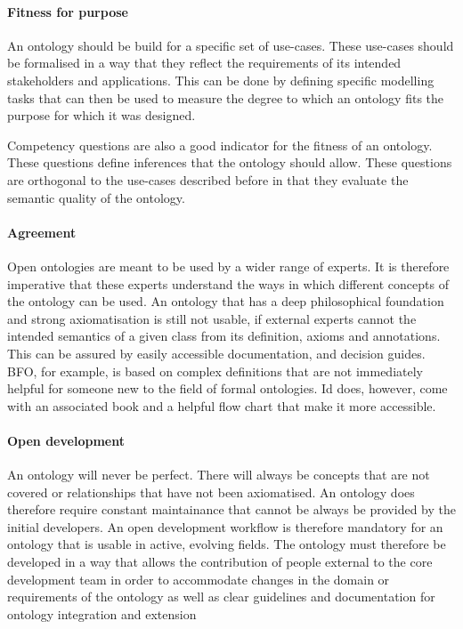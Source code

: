 \paragraph{Fitness for purpose}

An ontology should be build for a specific set of use-cases. These use-cases should be formalised in a way that they reflect the requirements of its intended stakeholders and applications. This can be done by defining specific modelling tasks that can then be used to measure the degree to which an ontology fits the purpose for which it was designed.

Competency questions are also a good indicator for the fitness of an ontology. These questions define inferences that the ontology should allow. These questions are orthogonal to the use-cases described before in that they evaluate the semantic quality of the ontology.

\paragraph{Agreement}

Open ontologies are meant to be used by a wider range of experts. It is therefore imperative that these experts understand the ways in which different concepts of the ontology can be used. An ontology that has a deep philosophical foundation and strong axiomatisation is still not usable, if external experts cannot the intended semantics of a given class from its definition, axioms and annotations. This can be assured by easily accessible documentation, and decision guides. BFO, for example, is based on complex definitions that are not immediately helpful for someone new to the field of formal ontologies. Id does, however, come with an associated book and a helpful flow chart  that make it more accessible.

\paragraph{Open development}

An ontology will never be perfect. There will always be concepts that are not covered or relationships that have not been axiomatised. An ontology does therefore require constant maintainance that cannot be always be provided by the initial developers. An open development workflow is therefore mandatory for an ontology that is usable in active, evolving fields. The ontology must therefore be developed in a way that allows the contribution of people external to the core development team in order to accommodate changes in the domain or requirements of the ontology as well as clear guidelines and documentation for ontology integration and extension%


